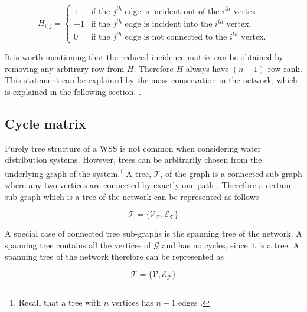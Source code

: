 \begin{equation}
\label{DiGraph}
 H_{i,j} =
		\left\{
		\begin{array}{ll}
		
		1 			&      \text{if the $j^{th}$ edge is incident out of the $i^{th}$ vertex}.	
\\
	    -1          &      \text{if the $j^{th}$ edge is incident into the $i^{th}$ vertex}.
\\
        0           &      \text{if the $j^{th}$ edge is not connected to the $i^{th}$ vertex}.

		\end{array}
		\right.
\end{equation}	

It is worth mentioning that the reduced incidence matrix can be obtained by removing any arbitrary row from $H$. Therefore $H$ always have $(n-1)$ row rank. This statement can be explained by the mass conservation in the network, which is explained in the following section, .

\subsection{Cycle matrix}
\label{cycle_matrix}

Purely tree structure of a WSS is not common when considering water distribution systems. However, trees can be arbitrarily chosen from the underlying graph of the system.\footnote{Recall that a tree with $n$ vertices has $n-1$ edges \cite{deo2017graph}.}  A tree, $\mathcal{T} $, of the graph is a connected sub-graph where any two vertices are connected by exactly one path \cite{deo2017graph}. Therefore a certain sub-graph which is a tree of the network can be represented as follows

\begin{equation}
  \label{Numberofchords}
  \mathcal{T} = \{\mathcal{V_{\mathcal{T}}}, \mathcal{E_{\mathcal{T}}} \} 
\end{equation}

A special case of connected tree sub-graphs is the spanning tree of the network. A spanning tree contains all the vertices of $\mathcal{G}$ and has no cycles, since it is a tree. A spanning tree of the network therefore can be represented as

\begin{equation}
  \label{Numberofchords}
  \mathcal{T} = \{\mathcal{V}, \mathcal{E_{\mathcal{T}}} \} 
\end{equation}

